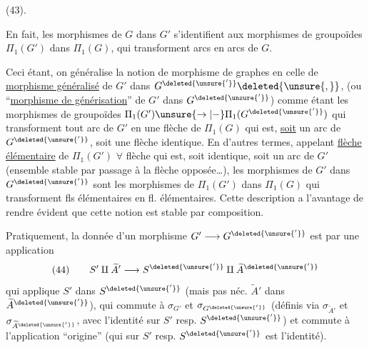 (43)\quad{}.

En fait, les morphismes de $G$ dans $G'$ s'identifient aux morphismes de groupoïdes $\Pi_1(G')$ dans $\Pi_1(G)$, qui transforment arcs  en arcs de $G$.

Ceci étant, on généralise la notion de morphisme de graphes en celle de \uline{morphisme généralisé} de $G'$ dans $G^{\deleted{\unsure{'}}}\deleted{\unsure{,}}$, (ou ``\uline{morphisme de générisation}'' de $G'$ dans $G^{\deleted{\unsure{'}}}$)
comme étant les morphismes de groupoïdes $\Pi_1(G')\unsure{\to|{-}}\Pi_1(G^{\deleted{\unsure{'}}})$ qui transforment tout arc de $G'$ en une flèche de $\Pi_1(G)$ qui est, \uline{soit} un arc de $G^{\deleted{\unsure{'}}}$, soit une flèche identique. En d'autres termes, appelant \uline{flèche élémentaire} de $\Pi_1(G')$ $\forall$ flèche qui est, soit identique, soit un arc de $G'$ (ensemble  stable par passage à la flèche opposée\ldots), les morphismes   de $G'$ dans $G^{\deleted{\unsure{'}}}$ sont les morphismes de $\Pi_1(G')$ dans $\Pi_1(G)$ qui transforment fls élémentaires en fl. élémentaires. Cette description a l'avantage de rendre évident que cette notion est stable par composition.

Pratiquement, la donnée d'un morphisme    $G'\longrightarrow G^{\deleted{\unsure{'}}}$ est 
par une application
\[
(44)\qquad S'\amalg\widetilde A'\longrightarrow S^{\deleted{\unsure{'}}}\amalg\widetilde A^{\deleted{\unsure{'}}}
\]
qui applique $S'$ dans $S^{\deleted{\unsure{'}}}$ (mais pas néc. $\widetilde A'$ dans $\widetilde A^{\deleted{\unsure{'}}}$), qui commute à $\sigma_{G'}$ et $\sigma_{G^{\deleted{\unsure{'}}}}$ (définis via $\sigma_{\widetilde A'}$ et $\sigma_{\widetilde A^{\deleted{\unsure{'}}}}$, avec l'identité sur $S'$ resp. $S^{\deleted{\unsure{'}}}$) et commute à l'application ``origine'' (qui sur $S'$ resp. $S^{\deleted{\unsure{'}}}$ est l'identité).


